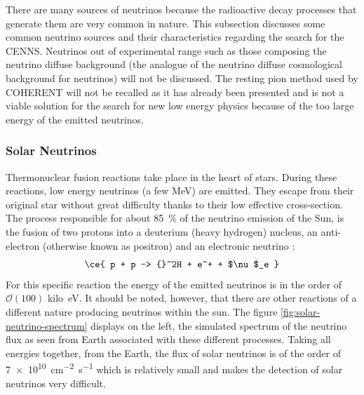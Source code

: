 There are many sources of neutrinos because the radioactive decay processes that generate them are very common in nature. This subsection discusses some common neutrino sources and their characteristics regarding the search for the CENNS. Neutrinos out of experimental range such as those composing the neutrino diffuse background (the analogue of the neutrino diffuse cosmological background for neutrinos) will not be discussed. The resting pion method used by COHERENT will not be recalled as it has already been presented and is not a viable solution for the search for new low energy physics because of the too large energy of the emitted neutrinos.

\subsubsection{Solar Neutrinos}

Thermonuclear fusion reactions take place in the heart of stars. During these reactions, low energy neutrinos (a few \si{\mega\eV}) are emitted. They escape from their original star without great difficulty thanks to their low effective cross-section. The process responsible for about \SI{85}{\percent} of the neutrino emission of the Sun, is the fusion of two protons  into a  deuterium (heavy hydrogen) nucleus, an anti-electron  (otherwise known as positron) and an electronic neutrino :
\begin{equation}
\ce{ p + p -> {}^2H + e^+ + $\nu$_e }
\end{equation}
For this specific reaction the energy of the emitted neutrinos is in the order of $\mathcal{O}(100)$ \si{kilo\eV}. It should be noted, however, that there are other reactions of a different nature producing neutrinos within the sun. The figure \ref{fig:solar-neutrino-spectrum} displays on the left, the simulated spectrum of the neutrino flux as seen from Earth associated with these different processes. Taking all energies together, from the Earth, the flux of solar neutrinos is of the order of \SI{7e10}{\cm^{-2} \s^{-1}} which is relatively small and makes the detection of solar neutrinos very difficult.

